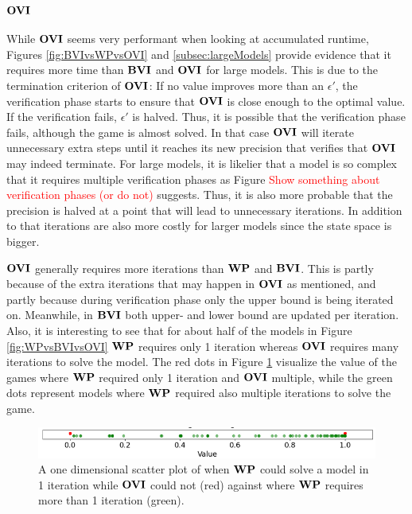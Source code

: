 \subsubsection*{$\OVI$}
While $\OVI$ seems very performant when looking at accumulated runtime, Figures \ref{fig:BVIvsWPvsOVI} and \ref{subsec:largeModels} provide evidence that it requires more time than $\mathbf{BVI}$ and $\OVI$ for large models.
This is due to the termination criterion of $\OVI$: 
If no value improves more than an $\epsilon'$, the verification phase starts to ensure that $\OVI$ is close enough to the optimal value.
If the verification fails, $\epsilon'$ is halved. 
Thus, it is possible that the verification phase fails, although the game is almost solved.
In that case $\OVI$ will iterate unnecessary extra steps until it reaches its new precision that verifies that $\OVI$ may indeed terminate.
For large models, it is likelier that a model is so complex that it requires multiple verification phases as Figure
\textcolor{red}{Show something about verification phases (or do not)} suggests. 
Thus, it is also more probable that the precision is halved at a point that will lead to unnecessary iterations.
In addition to that iterations are also more costly for larger models since the state space is bigger.

$\OVI$ generally requires more iterations than $\mathbf{WP}$ and $\mathbf{BVI}$. This is partly because of the extra iterations that may happen in $\OVI$ as mentioned, 
and partly because during verification phase only the upper bound is being iterated on. Meanwhile, in $\mathbf{BVI}$ both upper- and lower bound are updated per iteration.
Also, it is interesting to see that for about half of the models in Figure \ref{fig:WPvsBVIvsOVI} $\mathbf{WP}$ requires only 1 iteration whereas $\OVI$ requires many iterations to solve the model.
The red dots in Figure \ref{fig:OVIinstantCompute} visualize the value of the games where $\mathbf{WP}$ required only 1 iteration and $\OVI$ multiple,
while the green dots represent models where $\mathbf{WP}$ required also multiple iterations to solve the game.

\begin{figure}[h!]
    \centering
    \includegraphics[width=1\textwidth]{figures/OVI_Bad_At_Computing_Instant_Values.png}
    \caption[$\OVI$ cannot instantly compute models]{
        A one dimensional scatter plot of when $\mathbf{WP}$ could solve a model in 1 iteration while $\OVI$ could not (red) 
        against where $\mathbf{WP}$ requires more than 1 iteration (green).
    }
    \label{fig:OVIinstantCompute}
\end{figure}
\FloatBarrier


